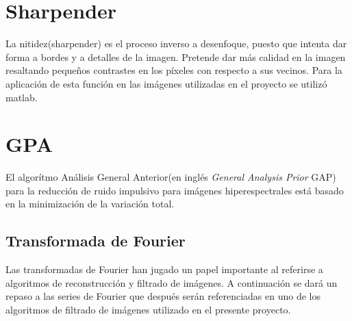 \section{Sharpender\cite{Sharp}}\label{capSharpender}
La nitidez(sharpender) es el proceso inverso a desenfoque, puesto que intenta dar forma a bordes y a detalles de la imagen.
Pretende dar más calidad en la imagen resaltando pequeños contrastes en los píxeles con respecto a sus vecinos.
Para la aplicación de esta función en las imágenes utilizadas en el proyecto se utilizó matlab.
\section{GPA}
El algorítmo Análisis General Anterior(en inglés \textit{General Analysis Prior} GAP) para la reducción de ruido impulsivo para imágenes hiperespectrales está basado en la minimización de la variación total.\cite{MatlabDenoising}
\subsection{Transformada de Fourier}
Las transformadas de Fourier han jugado un papel importante al referirse a algoritmos de reconstrucción y filtrado de imágenes. A continuación se dará un repaso a las series de Fourier que después serán referenciadas en uno de los algoritmos de filtrado de imágenes utilizado en el presente proyecto.
